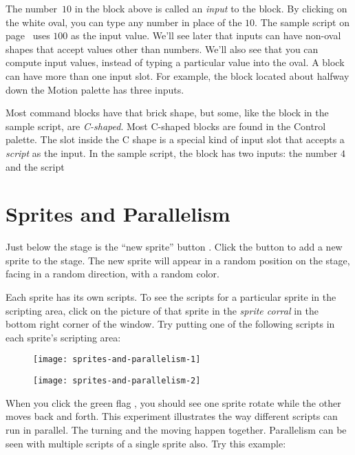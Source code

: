 \documentclass{report}
\begin{document}
The number~$10$ in the  block above is called an \emph{input} to the block. By clicking on the white oval, you can type any number in place of the $10$. The sample script on page~\pageref{fig:typical-script} uses $100$ as the input value. We'll see later that inputs can have non-oval shapes that accept values other than numbers. We'll also see that you can compute input values, instead of typing a particular value into the oval. A block can have more than one input slot. For example, the  block located about halfway down the Motion palette has three inputs.

Most command blocks have that brick shape, but some, like the  block in the sample script, are \emph{C-shaped}. Most C-shaped blocks are found in the Control palette. The slot inside the C shape is a special kind of input slot that accepts a \emph{script} as the input. In the sample script, the  block has two inputs: the number $4$ and the script\nopagebreak


\section{Sprites and Parallelism}

Just below the stage is the ``new sprite'' button . Click the button to add a new sprite to the stage. The new sprite will appear in a random position on the stage, facing in a random direction, with a random color.

Each sprite has its own scripts. To see the scripts for a particular sprite in the scripting area, click on the picture of that sprite in the \emph{sprite corral} in the bottom right corner of the window. Try putting one of the following scripts in each sprite's scripting area:\nopagebreak

\begin{figure}[H]
\begin{minipage}{0.5\textwidth}
\centering
\texttt{[image: sprites-and-parallelism-1]}
\end{minipage}%
\begin{minipage}{0.5\textwidth}
\centering
\texttt{[image: sprites-and-parallelism-2]}
\end{minipage}
\end{figure}

When you click the green flag , you should see one sprite rotate while the other moves back and forth. This experiment illustrates the way different scripts can run in parallel. The turning and the moving happen together. Parallelism can be seen with multiple scripts of a single sprite also. Try this example:\nopagebreak
\end{document}
